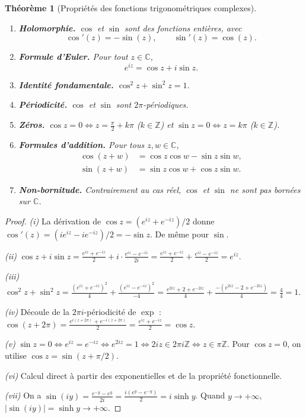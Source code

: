 \documentclass[12pt,a4paper,openany]{book}
\theoremstyle{definition}
\theoremstyle{plain}
\newtheorem{theoreme}[definition]{Théorème}
\theoremstyle{remark}
\newcommand{\C}{\mathbb{C}}
\newcommand{\Z}{\mathbb{Z}}
\newcommand{\abs}[1]{\left|#1\right|}
\begin{document}
\begin{theoreme}[Propriétés des fonctions trigonométriques complexes]\label{thm:proprietes-trig}
\leavevmode
\begin{enumerate}[label=(\roman*)]
  \item \textbf{Holomorphie.} $\cos$ et $\sin$ sont des fonctions entières, avec
  \[
    \cos'(z) = -\sin(z), \qquad \sin'(z) = \cos(z).
  \]
  \item \textbf{Formule d'Euler.} Pour tout $z \in \C$,
  \[
    e^{iz} = \cos z + i\sin z.
  \]
  \item \textbf{Identité fondamentale.} $\cos^2 z + \sin^2 z = 1$.
  \item \textbf{Périodicité.} $\cos$ et $\sin$ sont $2\pi$-périodiques.
  \item \textbf{Zéros.} $\cos z = 0 \iff z = \frac{\pi}{2} + k\pi$ ($k \in \Z$) et $\sin z = 0 \iff z = k\pi$ ($k \in \Z$).
  \item \textbf{Formules d'addition.} Pour tous $z, w \in \C$,
  \begin{align*}
    \cos(z+w) &= \cos z \cos w - \sin z \sin w, \\
    \sin(z+w) &= \sin z \cos w + \cos z \sin w.
  \end{align*}
  \item \textbf{Non-bornitude.} Contrairement au cas réel, $\cos$ et $\sin$ ne sont \emph{pas} bornées sur $\C$.
\end{enumerate}
\end{theoreme}

\begin{proof}
\emph{(i)} La dérivation de $\cos z = (e^{iz} + e^{-iz})/2$ donne
$\cos'(z) = (ie^{iz} - ie^{-iz})/2 = -\sin z$. De même pour $\sin$.

\emph{(ii)} $\cos z + i\sin z = \frac{e^{iz}+e^{-iz}}{2} + i\cdot\frac{e^{iz}-e^{-iz}}{2i} = \frac{e^{iz}+e^{-iz}}{2} + \frac{e^{iz}-e^{-iz}}{2} = e^{iz}$.

\emph{(iii)} $\cos^2 z + \sin^2 z = \frac{(e^{iz}+e^{-iz})^2}{4} + \frac{(e^{iz}-e^{-iz})^2}{-4} = \frac{e^{2iz}+2+e^{-2iz}}{4} + \frac{-(e^{2iz}-2+e^{-2iz})}{4} = \frac{4}{4} = 1$.

\emph{(iv)} Découle de la $2\pi i$-périodicité de $\exp$ : $\cos(z+2\pi) = \frac{e^{i(z+2\pi)}+e^{-i(z+2\pi)}}{2} = \frac{e^{iz}+e^{-iz}}{2} = \cos z$.

\emph{(v)} $\sin z = 0 \iff e^{iz} = e^{-iz} \iff e^{2iz} = 1 \iff 2iz \in 2\pi i\Z \iff z \in \pi\Z$. Pour $\cos z = 0$, on utilise $\cos z = \sin(z + \pi/2)$.

\emph{(vi)} Calcul direct à partir des exponentielles et de la propriété fonctionnelle.

\emph{(vii)} On a $\sin(iy) = \frac{e^{-y}-e^y}{2i} = \frac{i(e^y - e^{-y})}{2} = i\sinh y$. Quand $y \to +\infty$, $\abs{\sin(iy)} = \sinh y \to +\infty$.
\end{proof}
\end{document}
